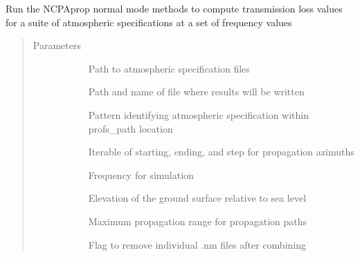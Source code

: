 \documentclass[letterpaper,10pt,english]{sphinxmanual}
\begin{document}
\begin{fulllineitems}
\label{\detokenize{stochprop.propagation:stochprop.propagation.run_modess}}
Run the NCPAprop normal mode methods to compute transmission
loss values for a suite of atmospheric specifications at
a set of frequency values
\begin{quote}\begin{description}
\item[{Parameters}] \leavevmode\begin{description}
\item[{}] \leavevmode
Path to atmospheric specification files

\item[{}] \leavevmode
Path and name of file where results will be written

\item[{}] \leavevmode
Pattern identifying atmospheric specification within profs\_path location

\item[{}] \leavevmode
Iterable of starting, ending, and step for propagation azimuths

\item[{}] \leavevmode
Frequency for simulation

\item[{}] \leavevmode
Elevation of the ground surface relative to sea level

\item[{}] \leavevmode
Maximum propagation range for propagation paths

\item[{}] \leavevmode
Flag to remove individual .nm files after combining

\end{description}

\end{description}\end{quote}

\end{fulllineitems}
\end{document}
